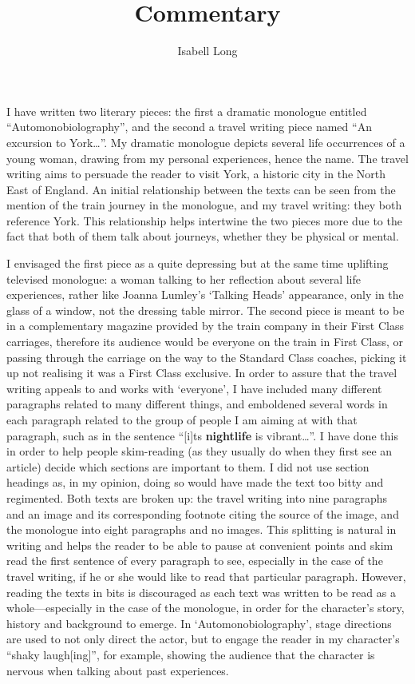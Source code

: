 \documentclass[11pt,a4paper]{article}
\begin{document}
\title{Commentary}
\author{Isabell Long}
\maketitle

I have written two literary pieces: the first a dramatic monologue entitled
``Automonobiolography'', and the second a travel writing piece named ``An
excursion to York\ldots''.  My dramatic monologue depicts several life
occurrences of a young woman, drawing from my personal experiences, hence
the name.  The travel writing aims to persuade the reader to visit York, a historic city in the North East of England.  An initial relationship between the texts can be seen from the mention of the train journey in the monologue, and my travel writing: they both reference York.  This relationship helps intertwine the two pieces more due to the fact that both of them talk about journeys, whether they be physical or mental.

I envisaged the first piece as a quite depressing but at the same time
uplifting televised monologue: a woman talking to her reflection about
several life experiences, rather like Joanna Lumley's `Talking Heads'
appearance, only in the glass of a window, not the dressing table mirror.
The second piece is meant to be in a complementary magazine provided by the
train company in their First Class carriages, therefore its audience would
be everyone on the train in First Class, or passing through the carriage on
the way to the Standard Class coaches, picking it up not realising it was a
First Class exclusive.  In order to assure that the travel writing appeals
to and works with `everyone', I have included many different paragraphs
related to many different things, and emboldened several words in each
paragraph related to the group of people I am aiming at with that
paragraph, such as in the sentence ``[i]ts \textbf{nightlife} is
vibrant\ldots''.  I have done this in order to help people skim-reading (as
they usually do when they first see an article) decide which sections are
important to them.  I did not use section headings as, in my opinion, doing
so would have made the text too bitty and regimented.  Both texts are
broken up: the travel writing into nine paragraphs and an image and its
corresponding footnote citing the source of the image, and the monologue
into eight paragraphs and no images.  This splitting is natural in writing
and helps the reader to be able to pause at convenient points and skim read
the first sentence of every paragraph to see, especially in the case of the
travel writing, if he or she would like to read that particular paragraph.
However, reading the texts in bits is discouraged as each text was written
to be read as a whole---especially in the case of the monologue, in order
for the character's story, history and background to emerge.  In
`Automonobiolography', stage directions are used to not only direct the
actor, but to engage the reader in my character's ``shaky laugh[ing]'', for
example, showing the audience that the character is nervous when talking about past
experiences.
 
\end{document}
